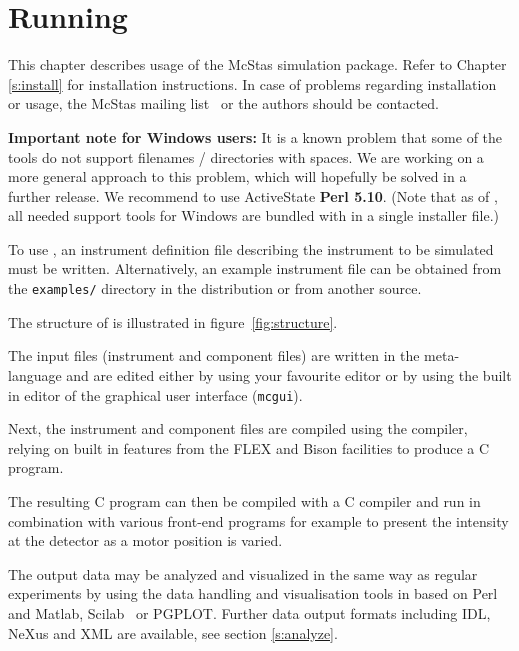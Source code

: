 
\chapter{Running \MCS}
\label{c:running}
This chapter describes usage of the McStas simulation package. Refer
to Chapter \ref{s:install} for installation instructions. In case of
problems regarding installation or usage, the McStas mailing
list~\cite{mcstas_webpage} or the authors should be contacted.

{\bf Important note for Windows users:} It is a known problem that some of
the \MCS tools do not support filenames / directories with spaces. %
We are working on a more general approach to this problem, which will
hopefully be solved in a further release. We recommend to use
ActiveState {\bf Perl 5.10}. (Note that as of , all needed
support tools for Windows are bundled with \MCS in a single installer file.)

To use \MCS, an instrument
definition file describing the instrument to be simulated must be
written. Alternatively, an example instrument file can be obtained
from the \verb+examples/+ directory in the distribution or from
another source.

The structure of \MCS is illustrated in figure~\ref{fig:structure}.

The input files (instrument and component files) are written in the \MCS
meta-language and are edited either by using your favourite editor
or by using the built in editor of the graphical user interface
(\texttt{mcgui}).

Next, the instrument and component files are compiled using the \MCS
compiler, relying on built in features from the FLEX and Bison facilities to produce a C program.

The resulting C program can then be
compiled with a C compiler and run in combination with various
front-end programs for example to present the intensity at the
detector as a motor position is varied.

The output data may be analyzed and visualized in the same way as
regular experiments by using the data handling and visualisation tools in \MCS based on
Perl and Matlab, Scilab~\cite{scilab_webpage} or PGPLOT. Further data
output formats including IDL, NeXus and XML are available, see section \ref{s:analyze}.

